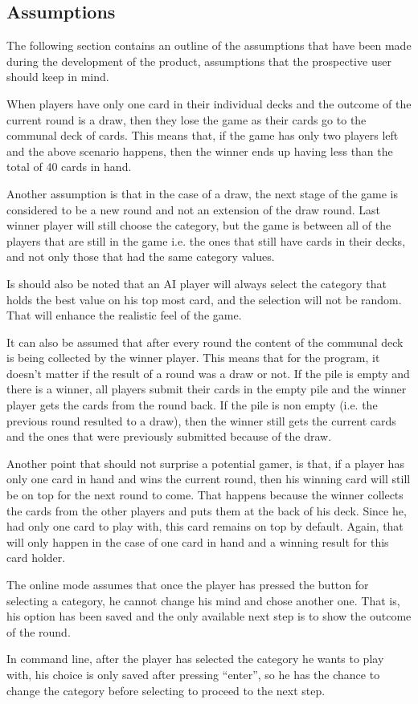 \subsection{Assumptions}

The following section contains an outline of the assumptions that have been made during the development of the product, assumptions that the prospective user should keep in mind.

When players have only one card in their individual decks and the outcome of the current round is a draw, then they lose the game as their cards go to the communal deck of cards. This means that, if the game has only two players left and the above scenario happens, then the winner ends up having less than the total of 40 cards in hand.

Another assumption is that in the case of a draw, the next stage of the game is considered to be a new round and not an extension of the draw round. Last winner player will still choose the category, but the game is between all of the players that are still in the game i.e. the ones that still have cards in their decks, and not only those that had the same category values.

Is should also be noted that an AI player will always select the category that holds the best value on his top most card, and the selection will not be random. That will enhance the realistic feel of the game.

It can also be assumed that after every round the content of the communal deck is being collected by the winner player. This means that for the program, it doesn't matter if the result of a round was a draw or not. If the pile is empty and there is a winner, all players submit their cards in the empty pile and the winner player gets the cards from the round back. If the pile is non empty (i.e. the previous round resulted to a draw), then the winner still gets the current cards and the ones that were previously submitted because of the draw.

Another point that should not surprise a potential gamer, is that, if a player has only one card in hand and wins the current round, then his winning card will still be on top for the next round to come. That happens because the winner collects the cards from the other players and puts them at the back of his deck. Since he, had only one card to play with, this card remains on top by default. Again, that will only happen in the case of one card in hand and a winning result for this card holder. 

The online mode assumes that once the player has pressed the button for selecting a category, he cannot change his mind and chose another one. That is, his option has been saved and the only available next step is to show the outcome of the round.

In command line, after the player has selected the category he wants to play with, his choice is only saved after pressing ``enter'', so he has the chance to change the category before selecting to proceed to the next step.
